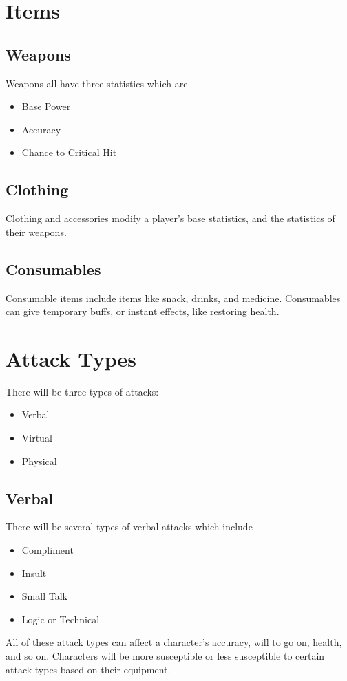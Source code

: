 \documentclass[12pt]{article}
\begin{document}
\section*{Items}
\subsection*{Weapons}
Weapons all have three statistics which are 
\begin{itemize}
\item Base Power
\item Accuracy 
\item Chance to Critical Hit
\end{itemize}
\subsection*{Clothing}
Clothing and accessories modify a player's base statistics, and the statistics 
of their weapons. 
\subsection*{Consumables}
Consumable items include items like snack, drinks, and medicine. Consumables 
can give temporary buffs, or instant effects, like restoring health. 

\section*{Attack Types}
There will be three types of attacks:
\begin{itemize}
\item Verbal
\item Virtual 
\item Physical
\end{itemize}
\subsection*{Verbal}
There will be several types of verbal attacks which include 
\begin{itemize}
\item Compliment 
\item Insult 
\item Small Talk 
\item Logic or Technical 
\end{itemize}
All of these attack types can affect a character's accuracy, will to go on, 
health, and so on. Characters will be more susceptible or less susceptible
 to certain attack types based on their equipment. 
 
\end{document}
